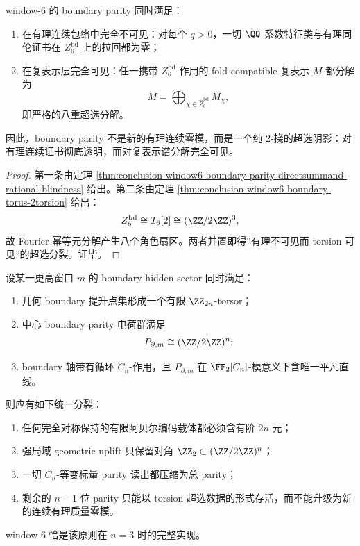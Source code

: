 \begin{theorem}\label{thm:conclusion-window6-boundary-rational-blind-torsion-superselection}
window-\(6\) 的 boundary parity 同时满足：
\begin{enumerate}
  \item 在有理连续包络中完全不可见：对每个 \(q>0\)，一切 \(\QQ\)-系数特征类与有理同伦证书在 \(Z_6^{\mathrm{bd}}\) 上的拉回都为零；
  \item 在复表示层完全可见：任一携带 \(Z_6^{\mathrm{bd}}\)-作用的 fold-compatible 复表示 \(M\) 都分解为
  \[
  M=\bigoplus_{\chi\in \widehat Z_6^{\mathrm{bd}}} M_{\chi},
  \]
  即严格的八重超选分解。
\end{enumerate}
因此，boundary parity 不是新的有理连续零模，而是一个纯 \(2\)-挠的超选阴影：对有理连续证书彻底透明，而对复表示谱分解完全可见。
\end{theorem}
\begin{proof}
第一条由定理 \ref{thm:conclusion-window6-boundary-parity-directsummand-rational-blindness} 给出。第二条由定理 \ref{thm:conclusion-window6-boundary-torus-2torsion} 给出：
\[
Z_6^{\mathrm{bd}}\cong T_6[2]\cong (\ZZ/2\ZZ)^3,
\]
故 Fourier 幂等元分解产生八个角色扇区。两者并置即得“有理不可见而 torsion 可见”的超选分裂。证毕。
\end{proof}

\begin{conjecture}\label{conj:conclusion-boundary-torsor-charge-splitting-principle}
设某一更高窗口 \(m\) 的 boundary hidden sector 同时满足：
\begin{enumerate}
  \item 几何 boundary 提升点集形成一个有限 \(\ZZ_{2n}\)-torsor；
  \item 中心 boundary parity 电荷群满足
  \[
  P_{\partial,m}\cong (\ZZ/2\ZZ)^n;
  \]
  \item boundary 轴带有循环 \(C_n\)-作用，且 \(P_{\partial,m}\) 在 \(\FF_2[C_n]\)-模意义下含唯一平凡直线。
\end{enumerate}
则应有如下统一分裂：
\begin{enumerate}
  \item 任何完全对称保持的有限阿贝尔编码载体都必须含有阶 \(2n\) 元；
  \item 强局域 geometric uplift 只保留对角 \(\ZZ_2\subset (\ZZ/2\ZZ)^n\)；
  \item 一切 \(C_n\)-等变标量 parity 读出都压缩为总 parity；
  \item 剩余的 \(n-1\) 位 parity 只能以 torsion 超选数据的形式存活，而不能升级为新的连续有理质量零模。
\end{enumerate}
window-\(6\) 恰是该原则在 \(n=3\) 时的完整实现。
\end{conjecture}
